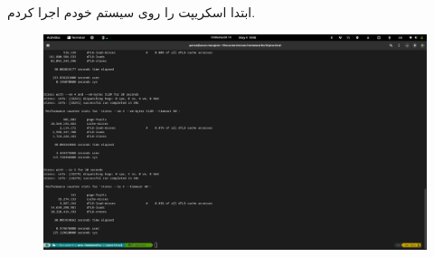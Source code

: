 \documentclass{article}
\begin{document}
\subsection{}
ابتدا اسکریپت را روی سیستم خودم اجرا کردم.
\begin{figure}[H]
   \centering
   \includegraphics[width=\linewidth]{3-1.png}
\end{figure}
\end{document}
